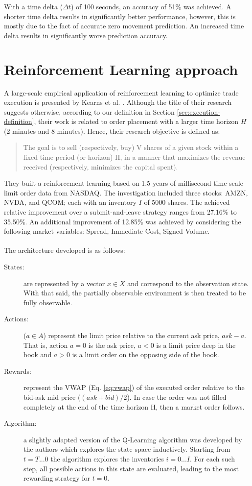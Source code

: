 With a time delta ($\Delta{t}$) of 100 seconds, an accuracy of 51\% was achieved.
A shorter time delta results in significantly better performance, however, this is mostly due to the fact of accurate zero movement prediction.
An increased time delta results in significantly worse prediction accuracy.

\section{Reinforcement Learning approach}

A large-scale empirical application of reinforcement learning to optimize trade execution is presented by Kearns et al. \cite{nevmyvaka2006reinforcement}.
Although the title of their research suggests otherwise, according to our definition in Section \ref{sec:execution-definition}, their work is related to order placement with a larger time horizon $H$ (2 minutes and 8 minutes).
Hence, their research objective is defined as:
\begin{quote}
    The goal is to sell (respectively, buy) V shares of a given stock within a fixed time period (or horizon) H, in a manner that maximizes the revenue received (respectively, minimizes the capital spent).
\end{quote}
They built a reinforcement learning based on 1.5 years of millisecond time-scale limit order data from NASDAQ.
The investigation included three stocks: AMZN, NVDA, and QCOM; each with an inventory $I$ of 5000 shares.
The achieved relative improvement over a submit-and-leave strategy ranges from 27.16\% to 35.50\%.
An additional improvement of 12.85\% was achieved by considering the following market variables: Spread, Immediate Cost, Signed Volume.
\\
\\
The architecture developed is as follows:
\begin{description}
    \item[States:] are represented by a vector $x \in X$ and correspond to the observation state.
    With that said, the partially observable environment is then treated to be fully observable.
    \item[Actions:] ($a \in A$) represent the limit price relative to the current ask price, $ask - a$. That is, action $a = 0$ is the ask price, $a < 0$ is a limit price deep in the book and $a > 0$ is a limit order on the opposing side of the book.
    \item[Rewards:] represent the VWAP (Eq. \ref{eq:vwap}) of the executed order relative to the bid-ask mid price ($(ask + bid) / 2$).
    In case the order was not filled completely at the end of the time horizon H, then a market order follows.
    \item[Algorithm:] a slightly adapted version of the Q-Learning algorithm was developed by the authors which explores the state space inductively.
    Starting from $t=T...0$ the algorithm explores the inventories $i=0...I$.
    For each such step, all possible actions in this state are evaluated, leading to the most rewarding strategy for $t=0$.
    
\end{description}